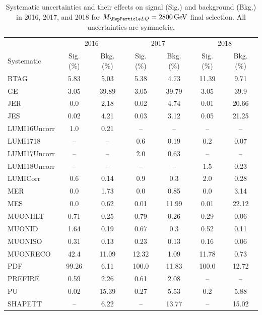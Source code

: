 \begin{table}[H]
	\begin{center}
        \begin{footnotesize}
			\caption{Systematic uncertainties and their effects on signal (Sig.) and background (Bkg.) in 2016, 2017, and 2018 for $\MLQ = \SI{2800}{GeV}$ final selection. All uncertainties are symmetric.}
			\begin{tabular}{lcccccc} \hline \hline
				& \multicolumn{2}{c}{2016} & \multicolumn{2}{c}{2017} & \multicolumn{2}{c}{2018} \\
				Systematic & Sig. (\%) & Bkg. (\%) & Sig. (\%) & Bkg. (\%) & Sig. (\%) & Bkg. (\%) \\ \hline
				BTAG &  5.83  &  5.03 &  5.38  &  4.73 &  11.39  &  9.71 \\
				GE &  3.05  &  39.89 &  3.05  &  39.79 &  3.05  &  39.9 \\
				JER &  0.0  &  2.18 &  0.02  &  4.74 &  0.01  &  20.66 \\
				JES &  0.02  &  4.21 &  0.03  &  3.12 &  0.05  &  21.25 \\
				LUMI16Uncorr &  1.0  &  0.21 & -- & -- & -- & -- \\
				LUMI1718 & -- & -- &  0.6  &  0.19 &  0.2  &  0.07 \\
				LUMI17Uncorr & -- & -- &  2.0  &  0.63 & -- & -- \\
				LUMI18Uncorr & -- & -- & -- & -- &  1.5  &  0.23 \\
				LUMICorr &  0.6  &  0.14 &  0.9  &  0.3 &  2.0  &  0.28 \\
				MER &  0.0  &  1.73 &  0.0  &  0.85 &  0.0  &  3.14 \\
				MES &  0.0  &  0.62 &  0.01  &  11.99 &  0.01  &  22.12 \\
				MUONHLT &  0.71  &  0.25 &  0.79  &  0.26 &  0.29  &  0.06 \\
				MUONID &  1.64  &  0.19 &  0.67  &  0.3 &  0.52  &  0.11 \\
				MUONISO &  0.31  &  0.13 &  0.23  &  0.13 &  0.16  &  0.06 \\
				MUONRECO &  42.4  &  11.09 &  12.32  &  1.09 &  11.78  &  0.73 \\
				PDF &  99.26  &  6.11 &  100.0  &  11.83 &  100.0  &  12.72 \\
				PREFIRE &  0.59  &  2.26 &  0.61  &  2.08 & -- & -- \\
				PU &  0.02  &  15.39 &  0.27  &  5.53 &  0.2  &  5.88 \\
				SHAPETT & -- &  6.22 & -- &  13.77 & -- &  15.02 \\

\end{tabular}
\end{footnotesize}
\end{center}
\end{table}
